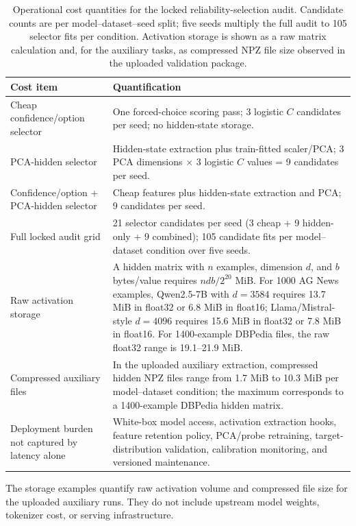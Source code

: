 
\begin{table}[t]
\centering
\small
\caption{Operational cost quantities for the locked reliability-selection audit. Candidate counts are per model--dataset--seed split; five seeds multiply the full audit to 105 selector fits per condition. Activation storage is shown as a raw matrix calculation and, for the auxiliary tasks, as compressed NPZ file size observed in the uploaded validation package.}
\label{tab:operational-cost-quantification}
\begin{threeparttable}
\begin{tabularx}{\textwidth}{p{}X}
\toprule
Cost item & Quantification \\
\midrule
Cheap confidence/option selector & One forced-choice scoring pass; 3 logistic $C$ candidates per seed; no hidden-state storage. \\
PCA-hidden selector & Hidden-state extraction plus train-fitted scaler/PCA; $3$ PCA dimensions $\times$ $3$ logistic $C$ values = 9 candidates per seed. \\
Confidence/option + PCA-hidden selector & Cheap features plus hidden-state extraction and PCA; 9 candidates per seed. \\
Full locked audit grid & 21 selector candidates per seed (3 cheap + 9 hidden-only + 9 combined); 105 candidate fits per model--dataset condition over five seeds. \\
Raw activation storage & A hidden matrix with $n$ examples, dimension $d$, and $b$ bytes/value requires $ndb/2^{20}$ MiB. For 1000 AG News examples, Qwen2.5-7B with $d=3584$ requires 13.7 MiB in float32 or 6.8 MiB in float16; Llama/Mistral-style $d=4096$ requires 15.6 MiB in float32 or 7.8 MiB in float16. For 1400-example DBPedia files, the raw float32 range is 19.1--21.9 MiB. \\
Compressed auxiliary files & In the uploaded auxiliary extraction, compressed hidden NPZ files range from 1.7 MiB to 10.3 MiB per model--dataset condition; the maximum corresponds to a 1400-example DBPedia hidden matrix. \\
Deployment burden not captured by latency alone & White-box model access, activation extraction hooks, feature retention policy, PCA/probe retraining, target-distribution validation, calibration monitoring, and versioned maintenance. \\
\bottomrule
\end{tabularx}
\begin{tablenotes}[flushleft]\footnotesize\item The storage examples quantify raw activation volume and compressed file size for the uploaded auxiliary runs. They do not include upstream model weights, tokenizer cost, or serving infrastructure.\end{tablenotes}
\end{threeparttable}
\end{table}
